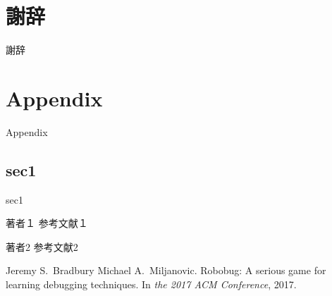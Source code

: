 \documentclass{jreport}
\begin{document}
\chapter*{謝辞}
{謝辞}

\appendix
\chapter{Appendix}
Appendix
\section{sec1}
sec1


% 
% 

\begin{thebibliography}{10}

著者１
\newblock 参考文献１

著者2
\newblock 参考文献2

Jeremy S.~Bradbury Michael A.~Miljanovic.
\newblock Robobug: A serious game for learning debugging techniques.
\newblock In {\em the 2017 ACM Conference}, 2017.

\end{thebibliography}
\end{document}

